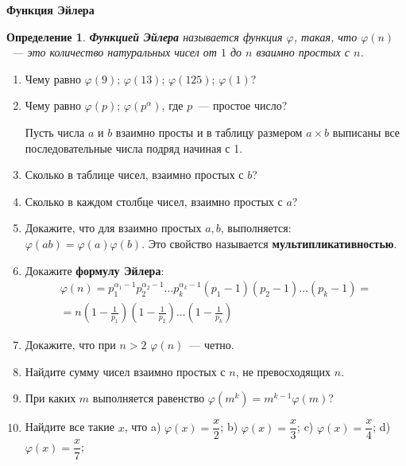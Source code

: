 \documentclass{article}
\newtheorem{definition}{Определение}
\begin{document}
\large
	
\begin{center}
	\textbf{Функция Эйлера}
\end{center}

\begin{definition}
	\textbf{Функцией Эйлера} называется функция $\varphi$, такая, что $\varphi(n)$~--- это количество натуральных чисел от $1$ до $n$ взаимно простых с $n$.
\end{definition}

\begin{enumerate}[label*=\protect\fbox{\arabic{enumi}}]

\item Чему равно $\varphi(9)$; $\varphi(13)$; $\varphi(125)$; $\varphi(1)$?

\item Чему равно $\varphi(p)$; $\varphi(p^\alpha)$, где $p$~--- простое число?


Пусть числа $a$ и $b$ взаимно просты и в таблицу размером $a \times b$ выписаны все последовательные числа подряд начиная с 1.

\item Сколько в таблице чисел, взаимно простых с $b$?
\item Сколько в каждом столбце чисел, взаимно простых с $a$?
\item Докажите, что для взаимно простых $a, b$, выполняется: $\varphi(ab) = \varphi(a)\varphi(b)$. Это свойство называется \textbf{мультипликативностью}.
\item Докажите \textbf{формулу Эйлера}:
\begin{align*}
	\varphi(n) = p_1^{\alpha_1 - 1}p_2^{\alpha_2 - 1}\ldots p_k^{\alpha_k - 1}(p_1 - 1)(p_2 - 1)\ldots (p_k - 1) =\\
	= n\left(1 - \frac{1}{p_1}\right)\left(1 - \frac{1}{p_2}\right)\ldots\left(1 - \frac{1}{p_k}\right)
\end{align*}

\item Докажите, что при $n > 2$ $\varphi(n)$~--- четно.

\item Найдите сумму чисел взаимно простых с $n$, не превосходящих $n$.

\item При каких $m$ выполняется равенство $\varphi(m^k) = m^{k - 1} \varphi(m)$?

\item Найдите все такие $x$, что a) $\varphi(x) = \dfrac{x}{2}$; b) $\varphi(x) = \dfrac{x}{3}$; c) $\varphi(x) = \dfrac{x}{4}$; d) $\varphi(x) = \dfrac{x}{7}$; 


\end{enumerate}
\end{document}
